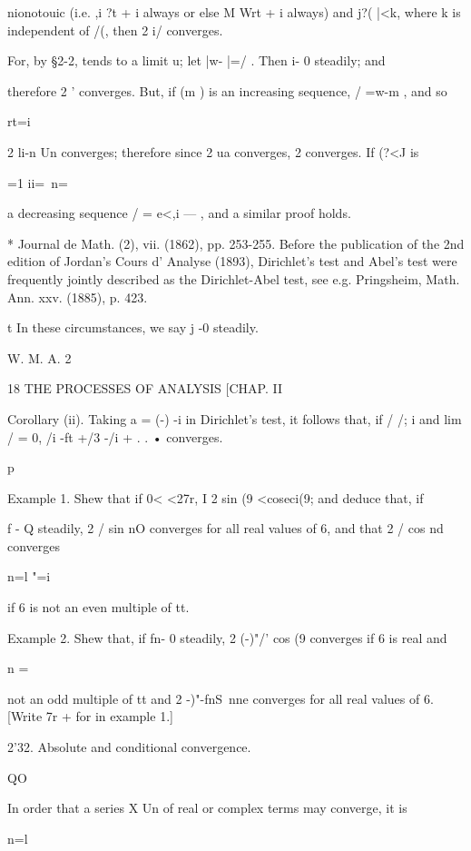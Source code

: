nionotouic (i.e. ,i ?t + i always or else M Wrt + i always) and j?(
|<k, where k is independent of /(, then 2 i/ converges.

For, by §2-2, tends to a limit u; let |w- |=/ . Then i- 0 steadily;
and

therefore 2 ' converges. But, if (m ) is an increasing sequence, /
=w-m , and so

rt=i

2 li-n Un converges; therefore since 2 ua converges, 2 converges. If
(?<J is

 =1 ii=\ n=\

a decreasing sequence / = e<,i — , and a similar proof holds.

* Journal de Math. (2), vii. (1862), pp. 253-255. Before the
publication of the 2nd edition of Jordan's Cours d' Analyse (1893),
Dirichlet's test and Abel's test were frequently jointly described as
the Dirichlet-Abel test, see e.g. Pringsheim, Math. Ann. xxv. (1885),
p. 423.

t In these circumstances, we say j -0 steadily.

W. M. A. 2



18 THE PROCESSES OF ANALYSIS [CHAP. II

Corollary (ii). Taking a = (-) -i in Dirichlet's test, it follows
that, if / /; i and lim / = 0, /i -ft +/3 -/i + . . • converges.



p



Example 1. Shew that if 0< <27r, I 2 sin (9 <coseci(9; and deduce
that, if



f - Q steadily, 2 / sin nO converges for all real values of 6, and
that 2 / cos nd converges

n=l "=i

if 6 is not an even multiple of tt.

Example 2. Shew that, if fn- 0 steadily, 2 (-)"/' cos (9 converges if
6 is real and

n = \

not an odd multiple of tt and 2 -)"-fnS\ nne converges for all real
values of 6. [Write 7r + for in example 1.]

2'32. Absolute and conditional convergence.

QO

In order that a series X Un of real or complex terms may converge, it
is

n=l

